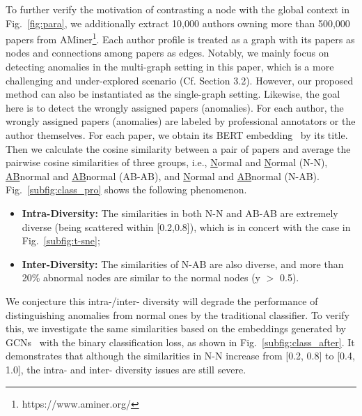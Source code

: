  To further verify the motivation of contrasting a node with the global context in Fig.~\ref{fig:para}, we additionally extract 10,000 authors owning more than 500,000 papers from AMiner\footnote{https://www.aminer.org/}. Each author profile is treated as a graph with its papers as nodes and connections among papers as edges.
Notably, we mainly focus on detecting anomalies in the multi-graph setting in this paper, which is a more challenging and under-explored scenario (Cf. Section 3.2). 
However, our proposed method can also be instantiated as the single-graph setting.
Likewise, the goal here is to detect the wrongly assigned papers (anomalies). For each author, the wrongly assigned papers (anomalies) are labeled by professional annotators or the author themselves. For each paper, we obtain its BERT embedding~\cite{devlin2019bert} by its title. Then we calculate the cosine similarity between a pair of papers and average the pairwise cosine similarities of three groups, i.e.,  \underline{N}ormal and \underline{N}ormal (N-N), \underline{AB}normal and \underline{AB}normal (AB-AB), and \underline{N}ormal and \underline{AB}normal (N-AB). 
Fig.~\ref{subfig:class_pro} shows the following phenomenon.
\begin{itemize}
	\item \textbf{Intra-Diversity:} The similarities in both N-N and AB-AB are extremely diverse (being scattered within [0.2,0.8]), which is in concert with the case in Fig.~\ref{subfig:t-sne}; 
	\item \textbf{Inter-Diversity:} The similarities of N-AB are also diverse, and more than 20\% abnormal nodes are similar to the normal nodes (y $>$ 0.5).
\end{itemize}



We conjecture this intra-/inter- diversity will degrade the performance of distinguishing anomalies from normal ones by the traditional classifier. To verify this, we investigate the same similarities based on the embeddings generated by GCNs~\cite{kipf2016semi} with the binary classification loss, as shown in 
Fig.~\ref{subfig:class_after}. It demonstrates that although the similarities in N-N increase from [0.2, 0.8] to [0.4, 1.0], the intra- and inter- diversity issues are still severe. 

